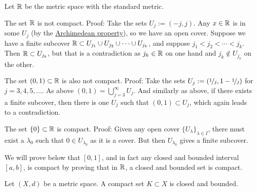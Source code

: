 \begin{example}
Let ${\mathbb{R}}$ be the metric space with the standard metric.

The set ${\mathbb{R}}$ is not compact.  Proof: Take the sets $U_j := (-j,j)$.
Any $x \in {\mathbb{R}}$ is in some $U_j$ (by the
\hyperref[thm:arch:i]{Archimedean property}), so we have an open cover.
Suppose we have a finite
subcover ${\mathbb{R}} \subset U_{j_1} \cup U_{j_2} \cup \cdots \cup U_{j_k}$,
and suppose $j_1 < j_2 < \cdots < j_k$.  Then ${\mathbb{R}} \subset U_{j_k}$, but that is
a contradiction as $j_k \in {\mathbb{R}}$ on one hand and $j_k \notin U_{j_k}$ on the
other.

The set $(0,1) \subset {\mathbb{R}}$ is also not compact.  Proof:  Take the 
sets $U_{j} := (\nicefrac{1}{j},1-\nicefrac{1}{j})$ for $j=3,4,5,\ldots$.
As above $(0,1) = \bigcup_{j=3}^\infty U_j$.  And similarly as above,
if there exists a finite subcover, then there is one $U_j$ such that $(0,1)
\subset U_j$, which again leads to a contradiction.

The set $\{ 0 \} \subset {\mathbb{R}}$ is compact.  Proof: Given any open cover $\{
U_{\lambda} \}_{\lambda \in I}$, there must exist a $\lambda_0$ such that $0
\in U_{\lambda_0}$ as it is a cover.  But then $U_{\lambda_0}$ gives a
finite subcover.

We will prove below that $[0,1]$, and in fact any closed and bounded
interval $[a,b]$, is compact by proving
that in ${\mathbb{R}}$, a closed and bounded set is compact.
\end{example}

\begin{prop}
Let $(X,d)$ be a metric space.  A compact set $K \subset X$ is closed and
bounded.
\end{prop}

